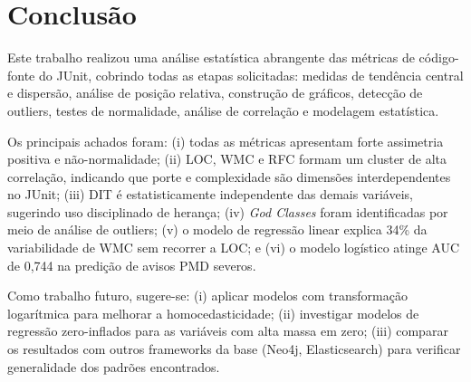 \documentclass[12pt]{article}
\begin{document}
\section{Conclusão}
\label{sec:conclusao}

Este trabalho realizou uma análise estatística abrangente das métricas
de código-fonte do JUnit, cobrindo todas as etapas solicitadas: medidas
de tendência central e dispersão, análise de posição relativa, construção
de gráficos, detecção de outliers, testes de normalidade, análise de
correlação e modelagem estatística.

Os principais achados foram: (i) todas as métricas apresentam forte
assimetria positiva e não-normalidade; (ii) LOC, WMC e RFC formam um
cluster de alta correlação, indicando que porte e complexidade são
dimensões interdependentes no JUnit; (iii) DIT é estatisticamente
independente das demais variáveis, sugerindo uso disciplinado de
herança; (iv) \textit{God Classes} foram identificadas por meio de
análise de outliers; (v) o modelo de regressão linear explica 34\% da
variabilidade de WMC sem recorrer a LOC; e (vi) o modelo logístico
atinge AUC de 0,744 na predição de avisos PMD severos.

Como trabalho futuro, sugere-se: (i) aplicar modelos com transformação
logarítmica para melhorar a homocedasticidade; (ii) investigar modelos
de regressão zero-inflados para as variáveis com alta massa em zero;
(iii) comparar os resultados com outros frameworks da base (Neo4j,
Elasticsearch) para verificar generalidade dos padrões encontrados.



\end{document}
